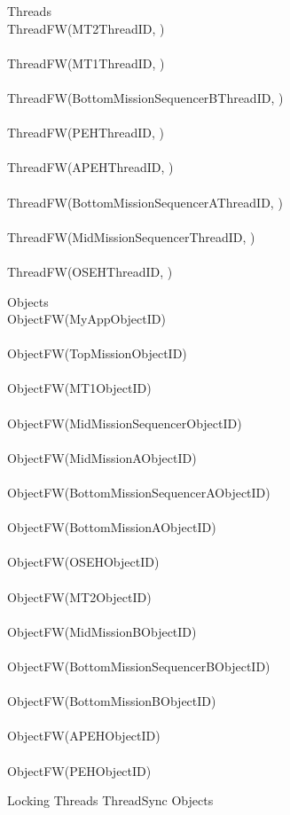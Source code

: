 %
\begin{circus}
\circprocess Threads \circdef  \\
\circblockopen
ThreadFW(MT2ThreadID, ) \\
\interleave \\
ThreadFW(MT1ThreadID, ) \\
\interleave \\
ThreadFW(BottomMissionSequencerBThreadID, ) \\
\interleave \\
ThreadFW(PEHThreadID, ) \\
\interleave \\
ThreadFW(APEHThreadID, ) \\
\interleave \\
ThreadFW(BottomMissionSequencerAThreadID, ) \\
\interleave \\
ThreadFW(MidMissionSequencerThreadID, ) \\
\interleave \\
ThreadFW(OSEHThreadID, ) \\

\circblockclose
\end{circus}
%
%
\begin{circus}
\circprocess Objects \circdef \\
\circblockopen
ObjectFW(MyAppObjectID) \\
\interleave \\
ObjectFW(TopMissionObjectID) \\
\interleave \\
ObjectFW(MT1ObjectID) \\
\interleave \\
ObjectFW(MidMissionSequencerObjectID) \\
\interleave \\
ObjectFW(MidMissionAObjectID) \\
\interleave \\
ObjectFW(BottomMissionSequencerAObjectID) \\
\interleave \\
ObjectFW(BottomMissionAObjectID) \\
\interleave \\
ObjectFW(OSEHObjectID) \\
\interleave \\
ObjectFW(MT2ObjectID) \\
\interleave \\
ObjectFW(MidMissionBObjectID) \\
\interleave \\
ObjectFW(BottomMissionSequencerBObjectID) \\
\interleave \\
ObjectFW(BottomMissionBObjectID) \\
\interleave \\
ObjectFW(APEHObjectID) \\
\interleave \\
ObjectFW(PEHObjectID) \\

\circblockclose
\end{circus}
%
%
\begin{circus}
\circprocess Locking \circdef Threads \lpar ThreadSync \rpar Objects
\end{circus}
